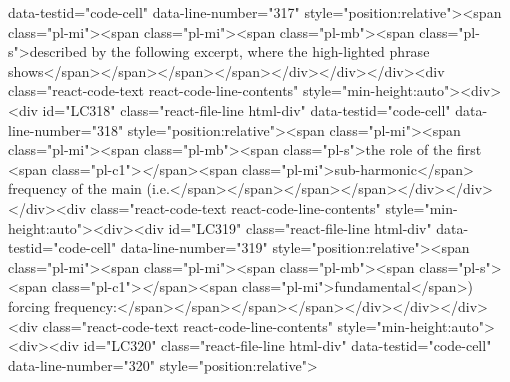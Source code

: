 {{{{data-testid="code-cell" data-line-number="317" style="position:relative"><span class="pl-mi"><span class="pl-mi"><span class="pl-mb"><span class="pl-s">described by the following excerpt, where the high-lighted phrase shows</span></span></span></span></div></div></div><div class="react-code-text react-code-line-contents" style="min-height:auto"><div><div id="LC318" class="react-file-line html-div" data-testid="code-cell" data-line-number="318" style="position:relative"><span class="pl-mi"><span class="pl-mi"><span class="pl-mb"><span class="pl-s">the role of the first <span class="pl-c1">\emph</span>{<span class="pl-mi">sub-harmonic</span>} frequency of the main (i.e.</span></span></span></span></div></div></div><div class="react-code-text react-code-line-contents" style="min-height:auto"><div><div id="LC319" class="react-file-line html-div" data-testid="code-cell" data-line-number="319" style="position:relative"><span class="pl-mi"><span class="pl-mi"><span class="pl-mb"><span class="pl-s"><span class="pl-c1">\emph</span>{<span class="pl-mi">fundamental</span>}) forcing frequency:</span></span></span></span></div></div></div><div class="react-code-text react-code-line-contents" style="min-height:auto"><div><div id="LC320" class="react-file-line html-div" data-testid="code-cell" data-line-number="320" style="position:relative">
}}}}
